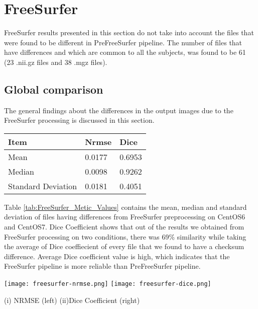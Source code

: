\section{FreeSurfer} \label{sec:Freesurfer}
FreeSurfer results presented in this section do not take into account the files that were found to be different in PreFreeSurfer pipeline. The number of files that have differences and which are common to all the subjects, was found to be 61 (23 .nii.gz files and 38 .mgz files).

\subsection{Global comparison}
The general findings about the differences in the output images due to the FreeSurfer processing is discussed in this section.

\begin{center}
\begin{tabular}{|l|l|l|}
\hline
\textbf{Item}      & \textbf{Nrmse} & \textbf{Dice} \\ \hline
Mean               & 0.0177    & 0.6953  \\ \hline
Median             & 0.0098    & 0.9262   \\ \hline
Standard Deviation & 0.0181     & 0.4051   \\ \hline
\end{tabular}
\label{tab:FreeSurfer_Metic_Values}
\end{center}

Table \ref{tab:FreeSurfer_Metic_Values} contains the mean, median and standard deviation of files having differences from FreeSurfer preprocessing on CentOS6 and CentOS7. Dice Coefficient shows that out of the results we obtained from FreeSurfer processing on two conditions, there was 69\% similarity while taking the average of Dice coeffiecient of every file that we found to have a checksum difference. Average Dice coefficient value is high, which indicates that the FreeSurfer pipeline is more reliable than PreFreeSurfer pipeline.

\begin{center}
\texttt{[image: freesurfer-nrmse.png]}%
\texttt{[image: freesurfer-dice.png]}
\caption*{(i) NRMSE (left) (ii)Dice Coefficient (right)}
\label{fig:freesurfer_metric_values}
\end{center}

